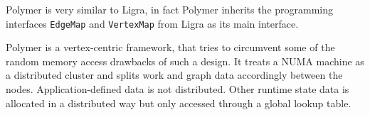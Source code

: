 
Polymer is very similar to Ligra, in fact Polymer inherits the programming interfaces \texttt{EdgeMap} and \texttt{VertexMap} from Ligra as its main interface.\cite{Polymer}

Polymer is a vertex-centric framework, that tries to circumvent some of the random memory access drawbacks of such a design. It treats a NUMA machine as a distributed cluster and splits work and graph data accordingly between the nodes.
Application-defined data is not distributed. Other runtime state data is allocated in a distributed way but only accessed through a global lookup table.



